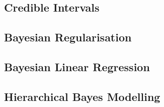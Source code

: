 \documentclass[11pt]{report} %
\begin{document}
\subsection{Credible Intervals}

\subsection{Bayesian Regularisation}

\subsection{Bayesian Linear Regression \cite{Rasmussen2006}}

\subsection{Hierarchical Bayes Modelling \cite{Rasmussen2006}}
\end{document}
